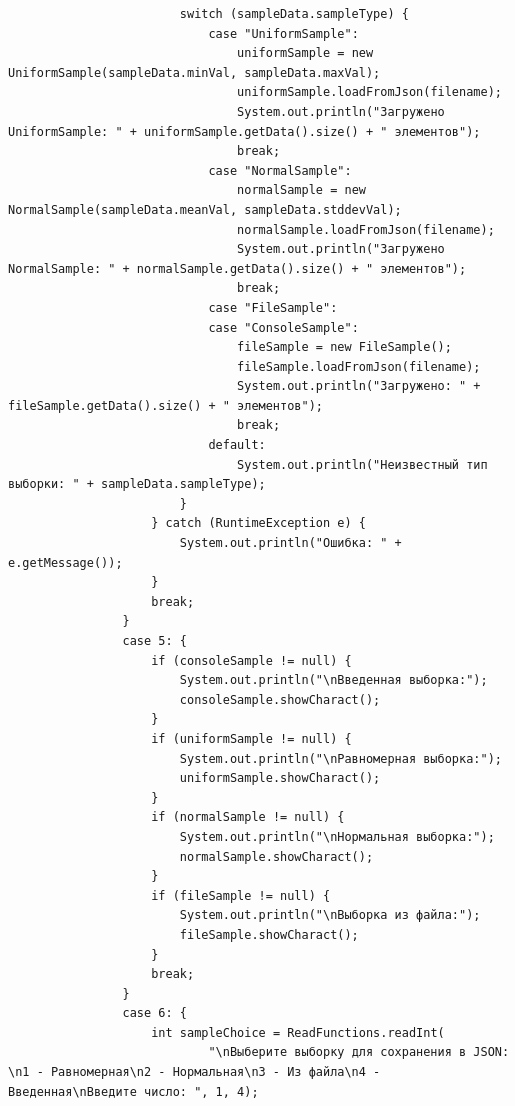 \begin{verbatim}
                        switch (sampleData.sampleType) {
                            case "UniformSample":
                                uniformSample = new UniformSample(sampleData.minVal, sampleData.maxVal);
                                uniformSample.loadFromJson(filename);
                                System.out.println("Загружено UniformSample: " + uniformSample.getData().size() + " элементов");
                                break;
                            case "NormalSample":
                                normalSample = new NormalSample(sampleData.meanVal, sampleData.stddevVal);
                                normalSample.loadFromJson(filename);
                                System.out.println("Загружено NormalSample: " + normalSample.getData().size() + " элементов");
                                break;
                            case "FileSample":
                            case "ConsoleSample":
                                fileSample = new FileSample();
                                fileSample.loadFromJson(filename);
                                System.out.println("Загружено: " + fileSample.getData().size() + " элементов");
                                break;
                            default:
                                System.out.println("Неизвестный тип выборки: " + sampleData.sampleType);
                        }
                    } catch (RuntimeException e) {
                        System.out.println("Ошибка: " + e.getMessage());
                    }
                    break;
                }
                case 5: {
                    if (consoleSample != null) {
                        System.out.println("\nВведенная выборка:");
                        consoleSample.showCharact();
                    }
                    if (uniformSample != null) {
                        System.out.println("\nРавномерная выборка:");
                        uniformSample.showCharact();
                    }
                    if (normalSample != null) {
                        System.out.println("\nНормальная выборка:");
                        normalSample.showCharact();
                    }
                    if (fileSample != null) {
                        System.out.println("\nВыборка из файла:");
                        fileSample.showCharact();
                    }
                    break;
                }
                case 6: {
                    int sampleChoice = ReadFunctions.readInt(
                            "\nВыберите выборку для сохранения в JSON: \n1 - Равномерная\n2 - Нормальная\n3 - Из файла\n4 - Введенная\nВведите число: ", 1, 4);


\end{verbatim}
